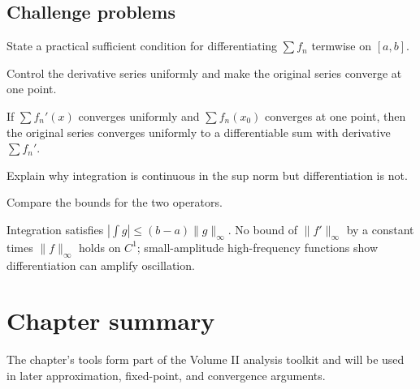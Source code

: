 \subsection*{Challenge problems}

\begin{exercise}\label{exr:ii12-expand-15}
State a practical sufficient condition for differentiating \(\sum f_n\) termwise on \([a,b]\).
\end{exercise}
\begin{hint}
Control the derivative series uniformly and make the original series converge at one point.
\end{hint}
\begin{solution}
If \(\sum f_n'(x)\) converges uniformly and \(\sum f_n(x_0)\) converges at one point, then the original series converges uniformly to a differentiable sum with derivative \(\sum f_n'\).
\end{solution}

\begin{exercise}\label{exr:ii12-expand-16}
Explain why integration is continuous in the sup norm but differentiation is not.
\end{exercise}
\begin{hint}
Compare the bounds for the two operators.
\end{hint}
\begin{solution}
Integration satisfies \(|\int g|\le(b-a)\|g\|_\infty\). No bound of \(\|f'\|_\infty\) by a constant times \(\|f\|_\infty\) holds on \(C^1\); small-amplitude high-frequency functions show differentiation can amplify oscillation.
\end{solution}
\section*{Chapter summary}
The chapter's tools form part of the Volume II analysis toolkit and will be used in later approximation, fixed-point, and convergence arguments.
